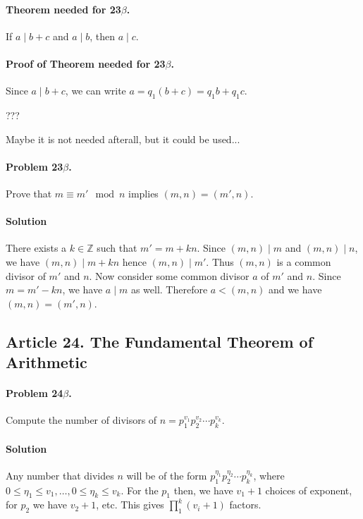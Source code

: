 \paragraph{Theorem needed for 23$\beta$.}
If $ a \mid b + c $ and $ a \mid b $, then $ a \mid c $.

\paragraph*{Proof of Theorem needed for 23$\beta$.}
Since $ a \mid b + c$, we can write $ a = q_1 (b +c) = q_1 b + q_1 c$.

???

Maybe it is not needed afterall, but it could be used...

\paragraph{Problem 23$\beta$.}
Prove that $ m \equiv m' \mod n $ implies $ (m,n) = (m', n)$.

\paragraph*{Solution}
There exists a $ k \in \mathbb{Z} $ such that $m' = m + kn$. Since $ (m,n) \mid
m $ and $ (m,n) \mid n$, we have $(m,n) \mid m + kn$ hence $(m,n) \mid m'$.
Thus $(m,n)$ is a common divisor of $m'$ and $n$. Now consider some common
divisor $a$ of $m'$ and $n$. Since $m = m' - kn$, we have $a \mid m $ as well.
Therefore $ a < (m,n) $ and we have $ (m,n) = (m',n) $.

\subsection{Article 24. The Fundamental Theorem of Arithmetic}

\paragraph{Problem 24$\beta$.}
Compute the number of divisors of $ n = p_1^{v_1} p_2^{v_2} \cdots p_k^{v_k} $.

\paragraph*{Solution}
Any number that divides $ n $ will be of the form $ p_1^{\eta_1} p_2^{\eta_2}
\cdots p_k^{\eta_k} $, where $ 0 \leq \eta_1 \leq v_1, \dots, 0 \leq \eta_k \leq v_k $.
For the $ p_1 $ then, we have $ v_1 + 1 $ choices of exponent, for $ p_2 $ we have
$ v_2 + 1 $, etc. This gives $ \prod_1^k (v_i + 1) $ factors.

